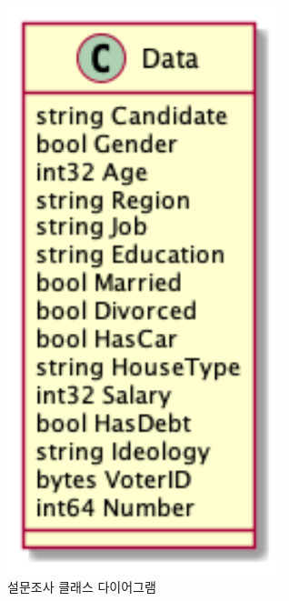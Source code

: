 \documentclass[8pt,a4paper,left=8mm,right=8mm,top=10mm,bottom=10mm]{article}
\begin{document}
    \begin{figure}[h]
        \begin{center}
            \includegraphics[width=8cm]{survey-class}
            \caption{설문조사 클래스 다이어그램}
        \end{center}
    \end{figure}
\end{document}
